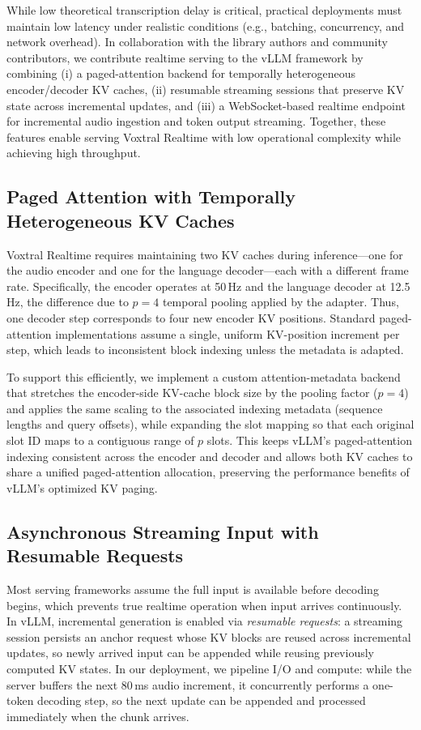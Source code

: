 While low theoretical transcription delay is critical, practical deployments must maintain low latency under realistic conditions (e.g., batching, concurrency, and network overhead). In collaboration with the library authors and community contributors, we contribute realtime serving to the vLLM framework \citep{kwon2023efficient} by combining (i) a paged-attention backend for temporally heterogeneous encoder/decoder KV caches, (ii) resumable streaming sessions that preserve KV state across incremental updates, and (iii) a WebSocket-based realtime endpoint for incremental audio ingestion and token output streaming. Together, these features enable serving Voxtral Realtime with low operational complexity while achieving high throughput.

\subsection{Paged Attention with Temporally Heterogeneous KV Caches}

Voxtral Realtime requires maintaining two KV caches during inference---one for the audio encoder and one for the language decoder---each with a different frame rate. Specifically, the encoder operates at 50\,Hz and the language decoder at 12.5\,Hz, the difference due to $p=4$ temporal pooling applied by the adapter. Thus, one decoder step corresponds to four new encoder KV positions. Standard paged-attention implementations assume a single, uniform KV-position increment per step, which leads to inconsistent block indexing unless the metadata is adapted.

 To support this efficiently, we implement a custom attention-metadata backend that stretches the encoder-side KV-cache block size by the pooling factor ($p=4$) and applies the same scaling to the associated indexing metadata (sequence lengths and query offsets), while expanding the slot mapping so that each original slot ID maps to a contiguous range of $p$ slots. This keeps vLLM's paged-attention indexing consistent across the encoder and decoder and allows both KV caches to share a unified paged-attention allocation, preserving the performance benefits of vLLM's optimized KV paging.

\subsection{Asynchronous Streaming Input with Resumable Requests}

Most serving frameworks assume the full input is available before decoding begins, which prevents true realtime operation when input arrives continuously. In vLLM, incremental generation is enabled via \emph{resumable requests}: a streaming session persists an anchor request whose KV blocks are reused across incremental updates, so newly arrived input can be appended while reusing previously computed KV states. In our deployment, we pipeline I/O and compute: while the server buffers the next 80\,ms audio increment, it concurrently performs a one-token decoding step, so the next update can be appended and processed immediately when the chunk arrives.

